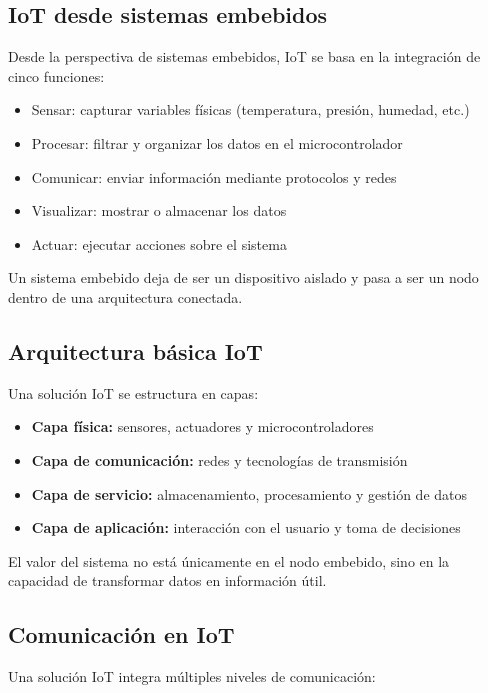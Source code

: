 \documentclass[conference]{IEEEtran}
\begin{document}
\subsection{IoT desde sistemas embebidos}

Desde la perspectiva de sistemas embebidos, IoT se basa en la integración de cinco funciones:

\begin{itemize}
    \item Sensar: capturar variables físicas (temperatura, presión, humedad, etc.)
    \item Procesar: filtrar y organizar los datos en el microcontrolador
    \item Comunicar: enviar información mediante protocolos y redes
    \item Visualizar: mostrar o almacenar los datos
    \item Actuar: ejecutar acciones sobre el sistema
\end{itemize}

Un sistema embebido deja de ser un dispositivo aislado y pasa a ser un nodo dentro de una arquitectura conectada.

\subsection{Arquitectura básica IoT}

Una solución IoT se estructura en capas:

\begin{itemize}
    \item \textbf{Capa física:} sensores, actuadores y microcontroladores
    \item \textbf{Capa de comunicación:} redes y tecnologías de transmisión
    \item \textbf{Capa de servicio:} almacenamiento, procesamiento y gestión de datos
    \item \textbf{Capa de aplicación:} interacción con el usuario y toma de decisiones
\end{itemize}

El valor del sistema no está únicamente en el nodo embebido, sino en la capacidad de transformar datos en información útil.

\subsection{Comunicación en IoT}

Una solución IoT integra múltiples niveles de comunicación:
\end{document}
